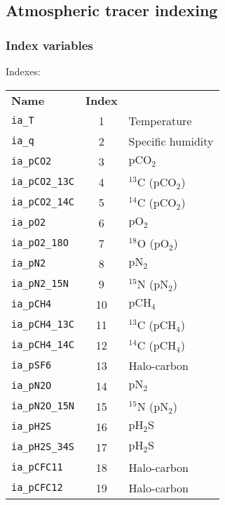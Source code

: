\documentclass[a4paper,10pt,article]{memoir}
\begin{document}
\subsection{Atmospheric tracer indexing}

\subsubsection{Index variables}

Indexes:
\begin{center}
\begin{tabular}{lcl}
  \textbf{Name} & \textbf{Index} & \\
\texttt{ia\_T}         &  1 & Temperature \\
\texttt{ia\_q}         &  2 & Specific humidity \\
\texttt{ia\_pCO2}      &  3 & $\mathrm{pCO_2}$ \\
\texttt{ia\_pCO2\_13C} &  4 & $\mathrm{^{13}C}$ ($\mathrm{pCO_2}$) \\
\texttt{ia\_pCO2\_14C} &  5 & $\mathrm{^{14}C}$ ($\mathrm{pCO_2}$) \\
\texttt{ia\_pO2}       &  6 & $\mathrm{pO_2}$ \\
\texttt{ia\_pO2\_18O}  &  7 & $\mathrm{^{18}O}$ ($\mathrm{pO_2}$) \\
\texttt{ia\_pN2}       &  8 & $\mathrm{pN_2}$ \\
\texttt{ia\_pN2\_15N}  &  9 & $\mathrm{^{15}N}$ ($\mathrm{pN_2}$) \\
\texttt{ia\_pCH4}      & 10 & $\mathrm{pCH_4}$ \\
\texttt{ia\_pCH4\_13C} & 11 & $\mathrm{^{13}C}$ ($\mathrm{pCH_4}$) \\
\texttt{ia\_pCH4\_14C} & 12 & $\mathrm{^{14}C}$ ($\mathrm{pCH_4}$) \\
\texttt{ia\_pSF6}      & 13 & Halo-carbon \\
\texttt{ia\_pN2O}      & 14 & $\mathrm{pN_2}$ \\
\texttt{ia\_pN2O\_15N} & 15 & $\mathrm{^{15}N}$ ($\mathrm{pN_2}$) \\
\texttt{ia\_pH2S}      & 16 & $\mathrm{pH_2S}$ \\
\texttt{ia\_pH2S\_34S} & 17 & $\mathrm{pH_2S}$ \\
\texttt{ia\_pCFC11}    & 18 & Halo-carbon \\
\texttt{ia\_pCFC12}    & 19 & Halo-carbon
\end{tabular}
\end{center}
\end{document}
